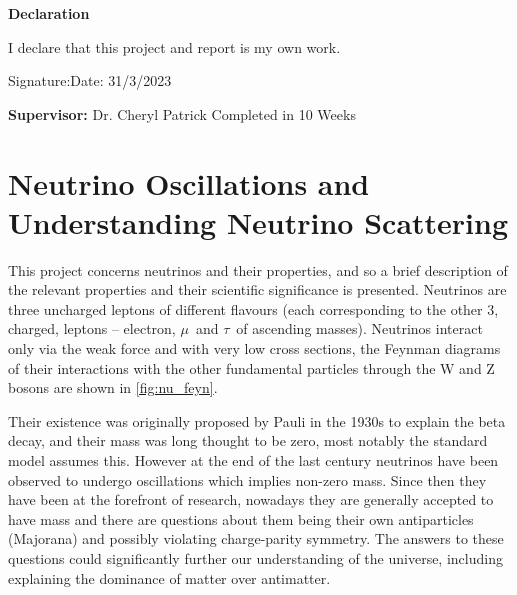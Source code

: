 \documentclass[a4paper,12pt]{article}
\newcommand{\Mu}{$\mu$}
\newcommand{\Tau}{$\tau$}
\begin{document}
\vspace*{1cm}

\begin{center}
    \textbf{\normalsize Declaration}

      I declare that this project and report is my own work.
\end{center}

\vspace*{3cm}
Signature:\hfill Date:  31/3/2023

\vfill
{\bf Supervisor:} Dr. Cheryl Patrick
\hfill
Completed in 10 Weeks
\newpage

\tableofcontents

\newpage

\pagestyle{plain}
\setcounter{page}{1}

\section{Neutrino Oscillations and Understanding Neutrino Scattering}
This project concerns neutrinos and their properties, and so a brief description of the relevant properties and their scientific significance is presented.
Neutrinos are three uncharged leptons of different flavours (each corresponding to the other 3, charged, leptons -- electron, \Mu\ and \Tau\ of ascending masses).
Neutrinos interact only via the weak force and with very low cross sections, the Feynman diagrams of their interactions with the other fundamental particles through the W and Z bosons are shown in \cref{fig:nu_feyn}.

Their existence was originally proposed by Pauli in the 1930s to explain the beta decay, and their mass was long thought to be zero, most notably the standard model assumes this.
However at the end of the last century neutrinos have been observed to undergo oscillations which implies non-zero mass.
Since then they have been at the forefront of research, nowadays they are generally accepted to have mass and there are questions about them being their own antiparticles (Majorana) and possibly violating charge-parity symmetry.
The answers to these questions could significantly further our understanding of the universe, including explaining the dominance of matter over antimatter.
\end{document}
